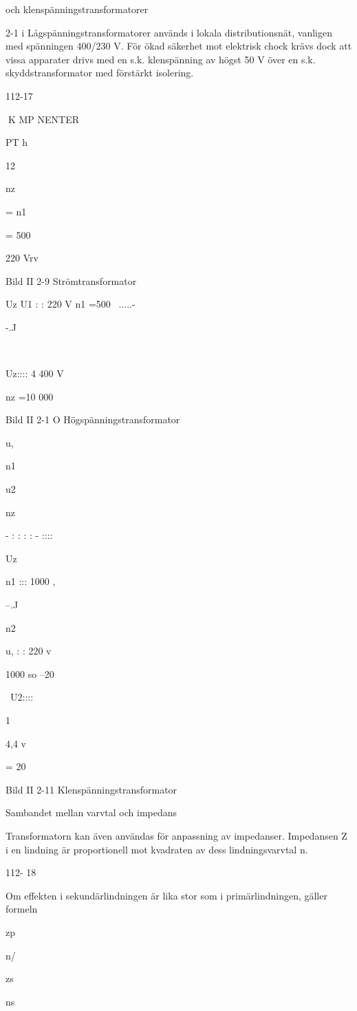 \documentclass[a4paper,twoside,twocolumn,openright]{book}
\begin{document}
{{{och klenspänningstransformatorer

2-1 i
Lågspänningstransformatorer används i lokala distributionsnät, vanligen med spänningen 400/230 V. För ökad säkerhet mot
elektrisk chock krävs dock att vissa apparater drivs med en s.k. klenspänning av högst
50 V över en s.k. skyddstransformator med
förstärkt isolering.

112-17

K MP NENTER

PT
h

12

nz

= n1

= 500

220 Vrv

Bild II 2-9 Strömtransformator

Uz
U1 : : 220 V
n1 =500 ~.....-   

-.J

~

Uz:::: 4 400 V

nz =10 000

Bild II 2-1 O Högspänningstransformator

u,

n1

u2

nz

- : : : : - ::::

Uz

n1 ::: 1000 ,   

--.J

n2

u, : : 220 v

1000
so
--20

~U2::::

1

4,4 v

= 20

Bild II 2-11 Klenspänningstransformator

Sambandet mellan varvtal och impedans

Transformatorn kan även användas för anpassning av impedanser. Impedansen Z i en
lindning är proportionell mot kvadraten av
dess lindningsvarvtal n.

112- 18

Om effekten i sekundärlindningen är lika
stor som i primärlindningen, gäller formeln

zp

n/

zs

ns

}}}
\end{document}
